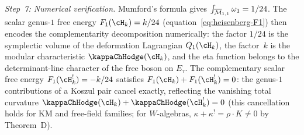 \begin{computation}
\medskip
\noindent
\textit{Step~7: Numerical verification.}\enspace
Mumford's formula gives
$\int_{\overline{\mathcal{M}}_{1,1}} \omega_1 = 1/24$.
The scalar genus-$1$ free energy
$F_1(\cH_k) = k/24$
(equation~\eqref{eq:heisenberg-F1}) then encodes the
complementarity decomposition numerically: the
factor $1/24$ is the symplectic volume of the deformation
Lagrangian $Q_1(\cH_k)$, the factor~$k$ is the modular
characteristic $\kappaChHodge(\cH_k)$, and the eta function belongs
to the determinant-line character of the free boson on $E_\tau$. The
complementary scalar free energy $F_1(\cH_k^!) = -k/24$
satisfies $F_1(\cH_k) + F_1(\cH_k^!) = 0$: the genus-$1$
contributions of a Koszul pair cancel exactly,
reflecting the vanishing total curvature
$\kappaChHodge(\cH_k) + \kappaChHodge(\cH_k^!) = 0$
(this cancellation holds for KM and free-field families;
for $W$-algebras, $\kappa + \kappa^! = \rho \cdot K \neq 0$
by Theorem~D).
\end{computation}

